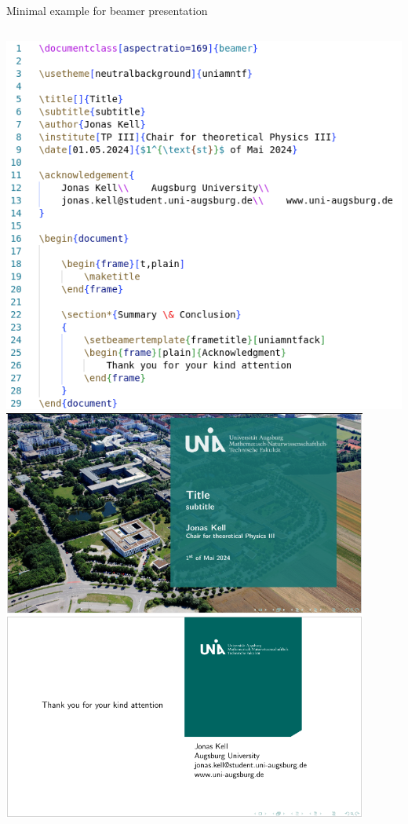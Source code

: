 \documentclass[aspectratio=169,handout]{beamer} %
\begin{document}
        \begin{frame}{Minimal example for beamer presentation}
            \begin{columns}
                    \includegraphics[width=1.1\textwidth]{./beamer-minimal-example/code.png}
                    \includegraphics[width=0.9\textwidth]{./beamer-minimal-example/result.png}
            \end{columns}
        \end{frame}
\end{document}
